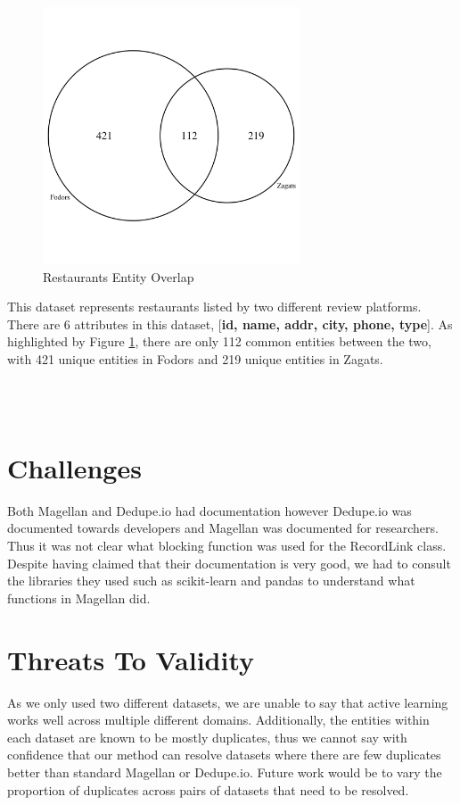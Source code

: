 \documentclass[letterpaper,twocolumn,10pt]{article}
\begin{document}
\begin{figure}[H]
\centering
\includegraphics[width=3in]{figures/restaurants_venn.png}
\caption{Restaurants Entity Overlap}
\label{fig:restaurants-png}
\end{figure}

This dataset represents restaurants listed by two different review platforms. There are 6 attributes in this dataset, [\textbf{id, name, addr, city, phone, type}]. As highlighted by Figure \ref{fig:restaurants-png}, there are only 112 common entities between the two, with 421 unique entities in Fodors and 219 unique entities in Zagats.



\noindent{}
\\\\

\section{Challenges}
Both Magellan and Dedupe.io had documentation however Dedupe.io was documented towards developers and Magellan was documented for researchers. Thus it was not clear what blocking function was used for the RecordLink class. Despite having claimed that their documentation is very good, we had to consult the libraries they used such as scikit-learn and pandas to understand what functions in Magellan did. 


\section{Threats To Validity}
As we only used two different datasets, we are unable to say that active learning works well across multiple different domains. Additionally, the entities within each dataset are known to be mostly duplicates, thus we cannot say with confidence that our method can resolve datasets where there are few duplicates better than standard Magellan or Dedupe.io. Future work would be to vary the proportion of duplicates across pairs of datasets that need to be resolved. 
\end{document}
